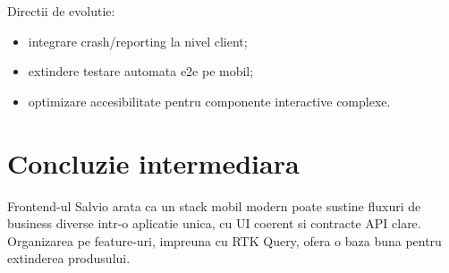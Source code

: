 Directii de evolutie:
\begin{itemize}[leftmargin=1.2cm]
    \item integrare crash/reporting la nivel client;
    \item extindere testare automata e2e pe mobil;
    \item optimizare accesibilitate pentru componente interactive complexe.
\end{itemize}

\section{Concluzie intermediara}

Frontend-ul Salvio arata ca un stack mobil modern poate sustine fluxuri de business diverse intr-o aplicatie unica, cu UI coerent si contracte API clare. Organizarea pe feature-uri, impreuna cu RTK Query, ofera o baza buna pentru extinderea produsului.
